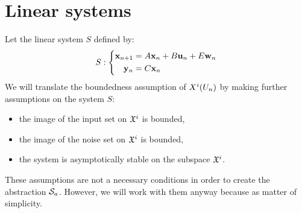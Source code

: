 \newcommand{\xinf}{\underline{\vect{x}}}%
\newcommand{\xsup}{\overline{\vect{x}}}%
\newcommand{\xinit}{\vect{x}_0}%
\newcommand{\xn}{\vect{x}_n}%
\newcommand{\un}{\vect{u}_n}%
\newcommand{\wn}{\vect{w}_n}%
\newcommand{\yn}{\vect{y}_n}%
\newcommand{\xnn}{\vect{x}_{n+1}}%
\newcommand{\Sproc}{$\mathcal{S}$-procedure}%
%
\section{Linear systems}
Let the linear system $S$ defined by:
\begin{equation} \label{lin_sys}
S:
\left\{
\begin{aligned}
\xnn &= A \xn + B \un + E \wn \\
\yn &= C \xn
\end{aligned}
\right.
\end{equation}
We will translate the boundedness assumption of $X^i(U_n)$ by making further assumptions on the system $S$:
\begin{itemize}[noitemsep,nolistsep]
\item the image of the input set on $\mathfrak{X}^i$ is bounded,
\item the image of the noise set on $\mathfrak{X}^i$ is bounded,
\item the system is asymptotically stable on the subspace $\mathfrak{X}^i$.
\end{itemize}
These assumptions are not a necessary conditions in order to create the abstraction $\mathcal{S}_a$. However, we will work with them anyway because as matter of simplicity.

